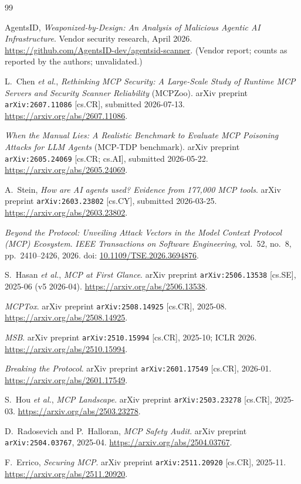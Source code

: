 \documentclass[10pt,conference]{IEEEtran}
\begin{document}
\begin{thebibliography}{99}

AgentsID, \emph{Weaponized-by-Design: An Analysis of Malicious Agentic AI
Infrastructure}. Vendor security research, April 2026.
\newblock \url{https://github.com/AgentsID-dev/agentsid-scanner}.
\newblock (Vendor report; counts as reported by the authors; unvalidated.)

L.~Chen \emph{et al.}, \emph{Rethinking MCP Security: A Large-Scale Study of
Runtime MCP Servers and Security Scanner Reliability} (MCPZoo). arXiv
preprint \texttt{arXiv:2607.11086} [cs.CR], submitted 2026-07-13.
\newblock \url{https://arxiv.org/abs/2607.11086}.

\emph{When the Manual Lies: A Realistic Benchmark to Evaluate MCP Poisoning
Attacks for LLM Agents} (MCP-TDP benchmark). arXiv preprint
\texttt{arXiv:2605.24069} [cs.CR; cs.AI], submitted 2026-05-22.
\newblock \url{https://arxiv.org/abs/2605.24069}.

A.~Stein, \emph{How are AI agents used? Evidence from 177,000 MCP tools}.
arXiv preprint \texttt{arXiv:2603.23802} [cs.CY], submitted 2026-03-25.
\newblock \url{https://arxiv.org/abs/2603.23802}.

\emph{Beyond the Protocol: Unveiling Attack Vectors in the Model Context
Protocol (MCP) Ecosystem}. \emph{IEEE Transactions on Software Engineering},
vol.~52, no.~8, pp.~2410--2426, 2026.
\newblock doi: \href{https://doi.org/10.1109/TSE.2026.3694876}
{10.1109/TSE.2026.3694876}.

S.~Hasan \emph{et al.}, \emph{MCP at First Glance}. arXiv preprint
\texttt{arXiv:2506.13538} [cs.SE], 2025-06 (v5 2026-04).
\newblock \url{https://arxiv.org/abs/2506.13538}.

\emph{MCPTox}. arXiv preprint \texttt{arXiv:2508.14925} [cs.CR], 2025-08.
\newblock \url{https://arxiv.org/abs/2508.14925}.

\emph{MSB}. arXiv preprint \texttt{arXiv:2510.15994} [cs.CR], 2025-10;
ICLR 2026.
\newblock \url{https://arxiv.org/abs/2510.15994}.

\emph{Breaking the Protocol}. arXiv preprint \texttt{arXiv:2601.17549}
[cs.CR], 2026-01.
\newblock \url{https://arxiv.org/abs/2601.17549}.

S.~Hou \emph{et al.}, \emph{MCP Landscape}. arXiv preprint
\texttt{arXiv:2503.23278} [cs.CR], 2025-03.
\newblock \url{https://arxiv.org/abs/2503.23278}.

D.~Radosevich and P.~Halloran, \emph{MCP Safety Audit}. arXiv preprint
\texttt{arXiv:2504.03767}, 2025-04.
\newblock \url{https://arxiv.org/abs/2504.03767}.

F.~Errico, \emph{Securing MCP}. arXiv preprint \texttt{arXiv:2511.20920}
[cs.CR], 2025-11.
\newblock \url{https://arxiv.org/abs/2511.20920}.

\end{thebibliography}
\end{document}
